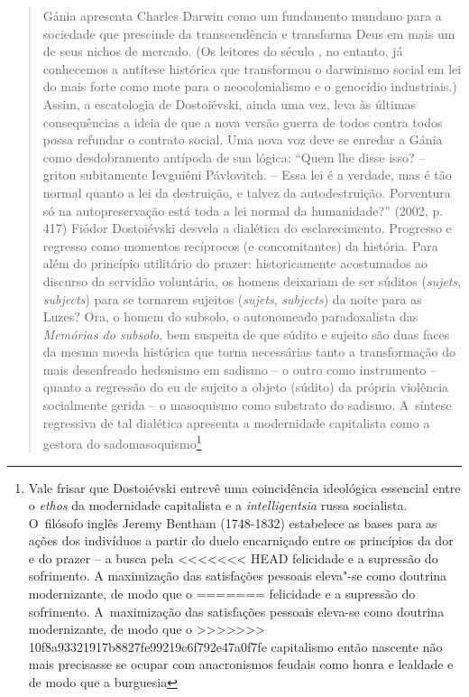 {\begin{quote}
Gánia apresenta Charles Darwin como um fundamento mundano para a
sociedade que prescinde da transcendência e transforma Deus em mais um
de seus nichos de mercado. (Os leitores do século , no entanto, já
conhecemos a antítese histórica que transformou o darwinismo social em
lei do mais forte como mote para o neocolonialismo e o genocídio
industriais.) Assim, a escatologia de Dostoiévski, ainda uma vez, leva
às últimas consequências a ideia de que a nova versão guerra de todos
contra todos possa refundar o contrato social. Uma nova voz deve se
enredar a Gánia como desdobramento antípoda de sua lógica: ``Quem lhe
disse isso? -- gritou subitamente Ievguiêni Pávlovitch. -- Essa lei é a
verdade, mas é tão normal quanto a lei da destruição, e talvez da
autodestruição. Porventura só na autopreservação está toda a lei normal
da humanidade?'' (2002, p. 417) Fiódor Dostoiévski desvela a dialética
do esclarecimento. Progresso e regresso como momentos recíprocos (e
concomitantes) da história. Para além do princípio utilitário do prazer:
historicamente acostumados ao discurso da servidão voluntária, os homens
deixariam de ser súditos (\emph{sujets}, \emph{subjects}) para se
tornarem sujeitos (\emph{sujets}, \emph{subjects}) da noite para as
Luzes? Ora, o homem do subsolo, o autonomeado paradoxalista das
\emph{Memórias do subsolo}, bem suspeita de que súdito e sujeito são
duas faces da mesma moeda histórica que torna necessárias tanto a
transformação do mais desenfreado hedonismo em sadismo -- o outro como
instrumento -- quanto a regressão do eu de sujeito a objeto (súdito) da
própria violência socialmente gerida -- o masoquismo como substrato do
sadismo. A~síntese regressiva de tal dialética apresenta a modernidade
capitalista como a gestora do sadomasoquismo\footnote{Vale frisar que
  Dostoiévski entrevê uma coincidência ideológica essencial entre o
  \emph{ethos} da modernidade capitalista e a \emph{intelligentsia}
  russa socialista. O~filósofo inglês Jeremy Bentham (1748-1832)
  estabelece as bases para as ações dos indivíduos a partir do duelo
  encarniçado entre os princípios da dor e do prazer -- a busca pela
<<<<<<< HEAD
  felicidade e a supressão do sofrimento. A maximização das satisfações
  pessoais eleva"-se como doutrina modernizante, de modo que o
=======
  felicidade e a supressão do sofrimento. A~maximização das satisfações
  pessoais eleva-se como doutrina modernizante, de modo que o
>>>>>>> 10f8a93321917b8827fe99219c6f792e47a0f7fe
  capitalismo então nascente não mais precisasse se ocupar com
  anacronismos feudais como honra e lealdade e de modo que a burguesia
}
\end{quote}}
